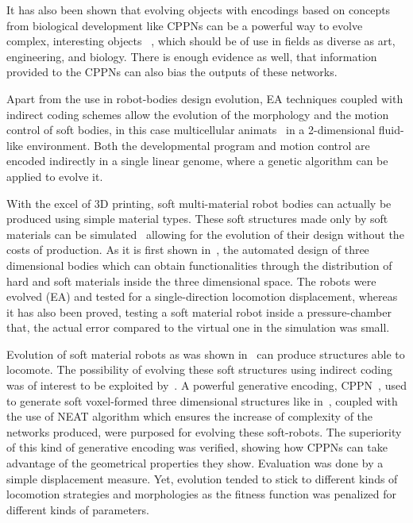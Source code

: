It has also been shown that evolving objects with encodings based on concepts from biological development like CPPNs can be a powerful way to evolve complex, interesting objects~\cite{clune2011evolving} , which should be of use in fields as diverse as art, engineering, and biology. There is enough evidence as well, that information provided to the CPPNs can also bias the outputs of these networks.

Apart from the use in robot-bodies design evolution, EA techniques coupled with indirect coding schemes allow the evolution of the morphology and the motion control of soft bodies, in this case  multicellular animats~\cite{joachimczak2012co} in a 2-dimensional fluid-like environment. Both the developmental program and motion control are encoded indirectly in a single linear genome, where a genetic algorithm can be applied to evolve it.

With the excel of $3$D printing, soft multi-material robot bodies can actually be produced using simple material types. These soft structures made only by soft materials can be simulated~\cite{hiller2012dynamic} allowing for the evolution of their design without the costs of production. As it is first shown in~\cite{hiller2012automatic}, the automated design of three dimensional bodies which can obtain functionalities through the distribution of hard and soft materials inside the three dimensional space. The robots were evolved (EA) and tested for a single-direction locomotion displacement, whereas it has also been proved, testing a soft material robot inside a pressure-chamber that, the actual error compared to the virtual one in the simulation was small.

Evolution of soft material robots as was shown in~\cite{hiller2012automatic} can produce structures able to locomote. The possibility of evolving these soft structures using indirect coding was of interest to be exploited by~\cite{cheney2013unshackling}. A powerful generative encoding, CPPN~\cite{stanley2007compositional}, used to generate soft voxel-formed three dimensional structures like in~\cite{hiller2012automatic}, coupled with the use of NEAT algorithm which ensures the increase of complexity of the networks produced, were purposed for evolving these soft-robots. The superiority of this kind of generative encoding was verified, showing how CPPNs can take advantage of the geometrical properties they show. Evaluation was done by a simple displacement measure. Yet, evolution tended to stick to different kinds of locomotion strategies and morphologies as the fitness function was penalized for different kinds of parameters.





